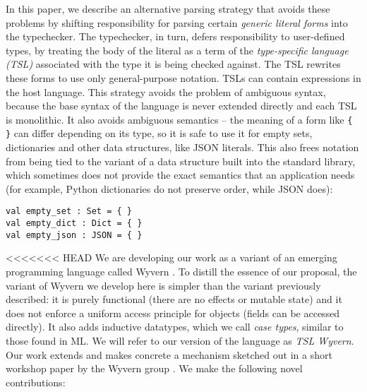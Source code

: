 In this paper, we describe an alternative parsing strategy that avoids these problems by shifting responsibility for parsing certain \emph{generic literal forms} into the typechecker. The typechecker, in turn, defers responsibility to user-defined types, by treating the body of the literal as a term of the   \emph{type-specific language (TSL)} associated with the type it is being checked against. The TSL rewrites these forms to use only general-purpose notation. TSLs can contain expressions in the host language. This strategy avoids the problem of ambiguous syntax, because the base syntax of the language is never extended directly and each TSL is monolithic. It also avoids ambiguous semantics -- the meaning of a form like \verb|{ }| can differ depending  on its type, so it is safe to use it for empty sets, dictionaries and other data structures, like JSON literals. This also frees notation from being tied to the variant of a  data structure built into the standard library, which sometimes does not provide the exact semantics that an application needs (for example, Python dictionaries do not preserve order, while JSON does):
\begin{lstlisting}
val empty_set : Set = { }
val empty_dict : Dict = { }
val empty_json : JSON = { }
\end{lstlisting}
<<<<<<< HEAD
We are developing our work as a variant of an emerging programming language called Wyvern \cite{Nistor:2013:WST:2489828.2489830}. To distill the essence of our proposal, the variant of Wyvern we develop here is simpler than the variant previously described: it is purely functional (there are no effects or mutable state) and it does not enforce a uniform access principle for objects (fields can be accessed directly). It also adds inductive datatypes, which we call \emph{case types}, similar to those found in ML. We will refer to our version of the language as \emph{TSL Wyvern}. Our work extends and makes concrete a mechanism sketched out in a short workshop paper by the Wyvern group \cite{Omar:2013:TWP:2489812.2489815}. We make the following novel contributions:
